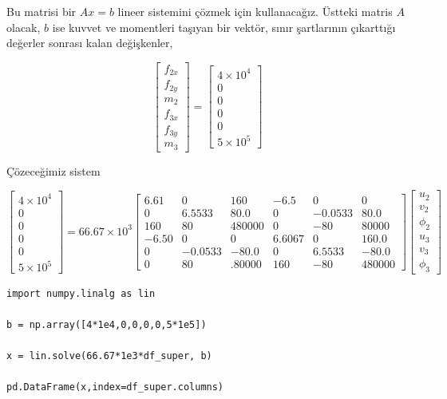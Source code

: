 \documentclass[12pt,fleqn]{article}\usepackage{../../common}
\begin{document}
Bu matrisi bir $Ax = b$ lineer sistemini çözmek için kullanacağız. Üstteki
matris $A$ olacak, $b$ ise kuvvet ve momentleri taşıyan bir vektör,
sınır şartlarının çıkarttığı değerler sonrası kalan değişkenler,

$$
\left[\begin{array}{c}
f_{2x} \\ f_{2y} \\ m_{2} \\ f_{3x} \\ f_{3y} \\ m_{3} 
\end{array}\right] =
\left[\begin{array}{c}
4 \times 10^4 \\ 0 \\ 0 \\ 0 \\ 0 \\ 5 \times 10^5
\end{array}\right]
$$

Çözeceğimiz sistem

$$
\left[\begin{array}{c}
4 \times 10^4 \\ 0 \\ 0 \\ 0 \\ 0 \\ 5 \times 10^5
\end{array}\right]
=
66.67 \times 10^3
\left[\begin{array}{cccccc}
  6.61 &  0 &     160 &   -6.5 &   0   &    0 \\
  0    & 6.5533 &  80.0 &    0 &  -0.0533 &   80.0 \\
160 &  80 &  480000 &    0 & -80 &   80000 \\
 -6.50 &   0 &       0 &    6.6067 &   0 &     160.0 \\
  0 &  -0.0533 &     -80.0 &    0 &   6.5533 &     -80.0 \\
  0 &  80 &.   80000 &  160 & -80 &  480000 
\end{array}\right]
\left[\begin{array}{c}
u_2 \\ v_2 \\ \phi_2 \\ u_3 \\ v_3 \\ \phi_3
\end{array}\right]
$$

\begin{verbatim}
import numpy.linalg as lin

b = np.array([4*1e4,0,0,0,0,5*1e5])

x = lin.solve(66.67*1e3*df_super, b)

pd.DataFrame(x,index=df_super.columns)
\end{verbatim}
\end{document}
